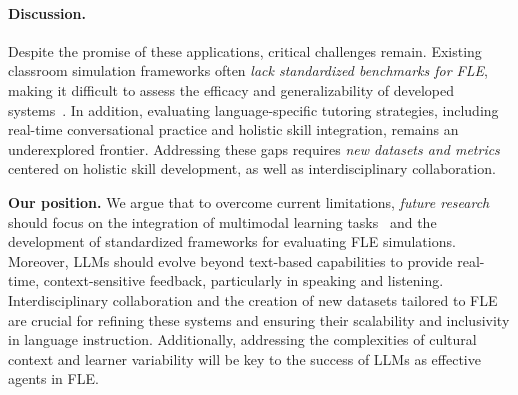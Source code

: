 \paragraph{Discussion.} Despite the promise of these applications, critical challenges remain. Existing classroom simulation frameworks often \textit{lack standardized benchmarks for FLE}, making it difficult to assess the efficacy and generalizability of developed systems~\cite{zhang2024simulating}. In addition, evaluating language-specific tutoring strategies, including real-time conversational practice and holistic skill integration, remains an underexplored frontier. Addressing these gaps requires \textit{new datasets and metrics} centered on holistic skill development, as well as interdisciplinary collaboration.

\begin{tcolorbox}[top=1pt, bottom=1pt, left=1pt, right=1pt]
\textbf{Our position.} We argue that to overcome current limitations, \textit{future research} should focus on the integration of multimodal learning tasks~\cite{sonlu2024effects} and the development of standardized frameworks for evaluating FLE simulations. Moreover, LLMs should evolve beyond text-based capabilities to provide real-time, context-sensitive feedback, particularly in speaking and listening. Interdisciplinary collaboration and the creation of new datasets tailored to FLE are crucial for refining these systems and ensuring their scalability and inclusivity in language instruction. Additionally, addressing the complexities of cultural context and learner variability will be key to the success of LLMs as effective agents in FLE.
\end{tcolorbox}



